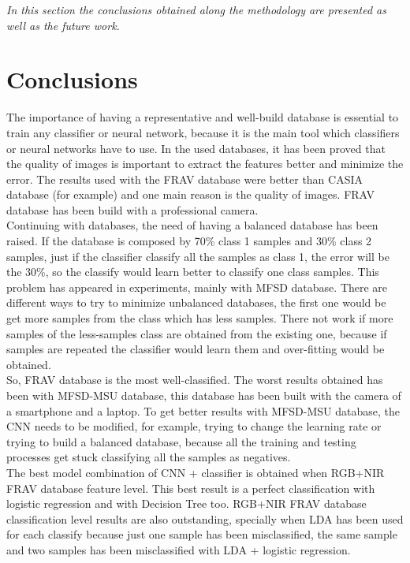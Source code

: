 \minitoc
\mtcskip

\begin{small}
\emph{In this section the conclusions obtained along the methodology are presented as well as the future work.\\}
\end{small}

\section{Conclusions}
The importance of having a representative and well-build database is essential to train any classifier or neural network, because it is the main tool which classifiers or neural networks have to use. In the used databases, it has been proved that the quality of images is important to extract the features better and minimize the error. The results used with the FRAV database were better than CASIA database (for example) and one main reason is the quality of images. FRAV database has been build with a professional camera.\\

Continuing with databases, the need of having a balanced database has been raised. If the database is composed by 70\% class 1 samples and 30\% class 2 samples, just if the classifier classify all the samples as class 1, the error will be the 30\%, so the classify would learn better to classify one class samples. This problem has appeared in experiments, mainly with MFSD database. There are different ways to try to minimize unbalanced databases, the first one would be get more samples from the class which has less samples. There not work if more samples of the less-samples class are obtained from the existing one, because if samples are repeated the classifier would learn them and over-fitting would be obtained.\\

So, FRAV database is the most well-classified. The worst results obtained has been with MFSD-MSU database, this database has been built with the camera of a smartphone and a laptop. To get better results with MFSD-MSU database, the CNN needs to be modified, for example, trying to change the learning rate or trying to build a balanced database, because all the training and testing processes get stuck classifying all the samples as negatives.\\

The best model combination of CNN + classifier is obtained when RGB+NIR FRAV database feature level. This best result is a perfect classification with logistic regression and with Decision Tree too. RGB+NIR FRAV database classification level results are also outstanding, specially when LDA has been used for each classify because just one sample has been misclassified, the same sample and two samples has been misclassified with LDA + logistic regression.\\

